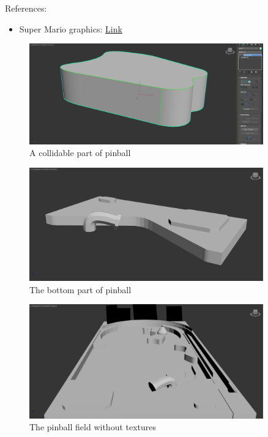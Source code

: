 \documentclass[11.5pt,oneside,a4paper]{scrartcl}
\begin{document}
References:
\begin{itemize}
\item Super Mario graphics: \href{https://google.de/}{Link}
\end{itemize}


\begin{figure}
	\centering
	\includegraphics[width=0.90\textwidth]{3dmodel.jpg}
	\caption{A collidable part of pinball}
	\label{fig:3dmodel}
	\vspace{0.1cm}
\end{figure}

\begin{figure}
	\centering
	\includegraphics[width=0.90\textwidth]{3dmodelbottom.jpg}
	\caption{The bottom part of pinball}
	\label{fig:pinballbottom}
	\vspace{0.1cm}
\end{figure}

\begin{figure}
	\centering
	\includegraphics[width=0.90\textwidth]{pinballwithouttextures.jpg}
	\caption{The pinball field without textures}
	\label{fig:pinballwithouttextures}
	\vspace{0.1cm}
\end{figure}
\end{document}
